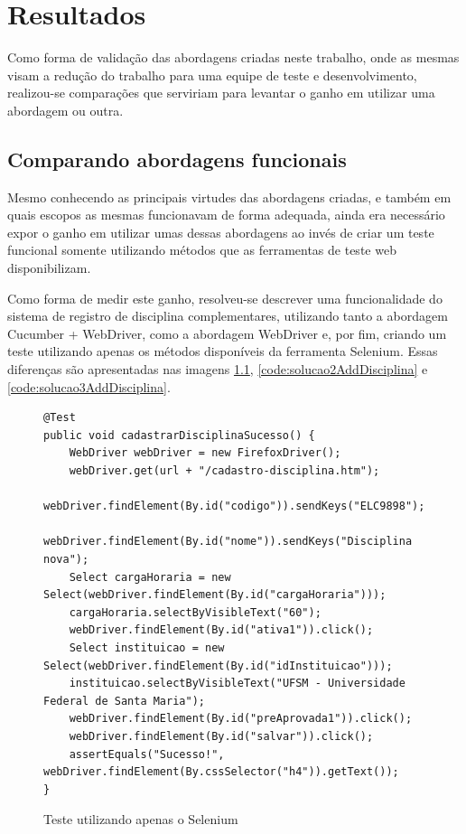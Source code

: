 \documentclass[tg]{mdtufsm}
\begin{document}
\chapter{Resultados}
Como forma de validação das abordagens criadas neste trabalho, onde as mesmas visam a redução do trabalho para uma equipe de teste e desenvolvimento, realizou-se comparações que serviriam para levantar o ganho em utilizar uma abordagem ou outra. 

\section{Comparando abordagens funcionais}
Mesmo conhecendo as principais virtudes das abordagens criadas, e também em quais escopos as mesmas funcionavam de forma adequada, ainda era necessário expor o ganho em utilizar umas dessas abordagens ao invés de criar um teste funcional somente utilizando métodos que as ferramentas de teste web disponibilizam.

Como forma de medir este ganho, resolveu-se descrever uma funcionalidade do sistema de registro de disciplina complementares, utilizando tanto a abordagem Cucumber + WebDriver, como a abordagem WebDriver e, por fim, criando um teste utilizando apenas os métodos disponíveis da ferramenta Selenium. Essas diferenças são apresentadas nas imagens \ref{code:seleniumAddDisciplina}, \ref{code:solucao2AddDisciplina} e \ref{code:solucao3AddDisciplina}.


\begin{figure}[!htt]
	\begin{lstlisting}
@Test
public void cadastrarDisciplinaSucesso() {
    WebDriver webDriver = new FirefoxDriver();
    webDriver.get(url + "/cadastro-disciplina.htm");
    webDriver.findElement(By.id("codigo")).sendKeys("ELC9898");
    webDriver.findElement(By.id("nome")).sendKeys("Disciplina nova");
    Select cargaHoraria = new Select(webDriver.findElement(By.id("cargaHoraria")));
    cargaHoraria.selectByVisibleText("60");
    webDriver.findElement(By.id("ativa1")).click();
    Select instituicao = new Select(webDriver.findElement(By.id("idInstituicao")));
    instituicao.selectByVisibleText("UFSM - Universidade Federal de Santa Maria");
    webDriver.findElement(By.id("preAprovada1")).click();
    webDriver.findElement(By.id("salvar")).click();
    assertEquals("Sucesso!", webDriver.findElement(By.cssSelector("h4")).getText());
}
	\end{lstlisting}
	\caption{Teste utilizando apenas o Selenium}
	\label{code:seleniumAddDisciplina}
\end{figure}
\end{document}
